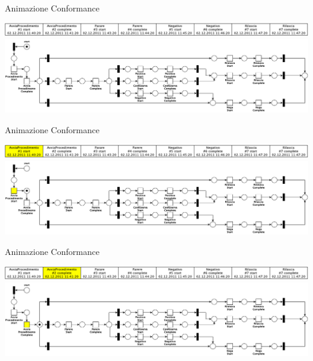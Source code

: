 \begin{frame}{Animazione Conformance}
 
  
  \begin{center}
    
    \includegraphics[scale=0.7]{./fig/animazioneconf/log}\\[10pt]
	    \includegraphics[scale=0.60]{./fig/animazioneconf/ConfPN}
  \end{center}

  
\end{frame}
\begin{frame}{Animazione Conformance}
 
  
  \begin{center}
   \includegraphics[scale=0.60]{./fig/animazioneconf/log1}\\[10pt]
    \includegraphics[scale=0.60]{./fig/animazioneconf/ConfPN1}
  \end{center}

  
\end{frame}
\begin{frame}{Animazione Conformance}
 
  
  \begin{center}
   \includegraphics[scale=0.60]{./fig/animazioneconf/log2}\\[10pt]
    \includegraphics[scale=0.60]{./fig/animazioneconf/ConfPN2}
  \end{center}

  
\end{frame}